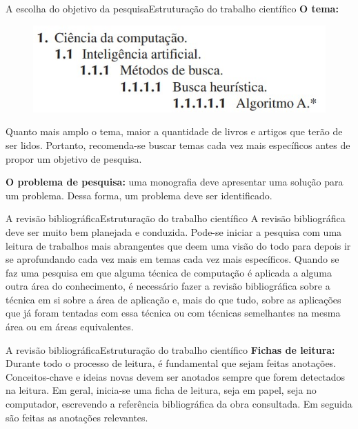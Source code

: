 \documentclass[t]{beamer}
\begin{document}
\begin{ftst}{A escolha do objetivo da pesquisa}{Estruturação do trabalho científico}
\justifying
\textbf{O tema:}
\begin{figure}
    \centering
    \includegraphics[scale=0.5]{Figuras/03_temas.jpg}
    \label{fig:temas}
\end{figure}
\vone
Quanto mais amplo o tema, maior a quantidade de livros e artigos que terão de ser lidos. Portanto, recomenda-se buscar temas cada vez mais específicos antes de propor um objetivo de pesquisa.

\vone
\textbf{O problema de pesquisa:} uma monografia deve apresentar uma solução para um problema. Dessa forma, um problema deve ser identificado.

\end{ftst}


\begin{ftst}{A revisão bibliográfica}{Estruturação do trabalho científico}
\justifying
A revisão bibliográfica deve ser muito bem planejada e conduzida.
\vone
Pode-se iniciar a pesquisa com uma leitura de trabalhos mais abrangentes que deem uma visão do todo para depois ir se aprofundando cada vez mais em temas cada vez mais específicos.
\vone
Quando se faz uma pesquisa em que alguma técnica de computação é aplicada a alguma outra área do conhecimento, é necessário fazer a revisão bibliográfica sobre a técnica em si sobre a área de aplicação e, mais do que tudo, sobre as aplicações que já foram tentadas com essa técnica ou com técnicas semelhantes na mesma área ou em áreas equivalentes.


\end{ftst}


\begin{ftst}{A revisão bibliográfica}{Estruturação do trabalho científico}
\justifying
\textbf{Fichas de leitura:}
\vone
Durante todo o processo de leitura, é fundamental que sejam feitas anotações.
\vone
Conceitos-chave e ideias novas devem ser anotados sempre que forem detectados na leitura. 
\vone
Em geral, inicia-se uma ficha de leitura, seja em papel, seja no computador,
escrevendo a referência bibliográfica da obra consultada. Em seguida são feitas as anotações relevantes.


\end{ftst}
\end{document}
